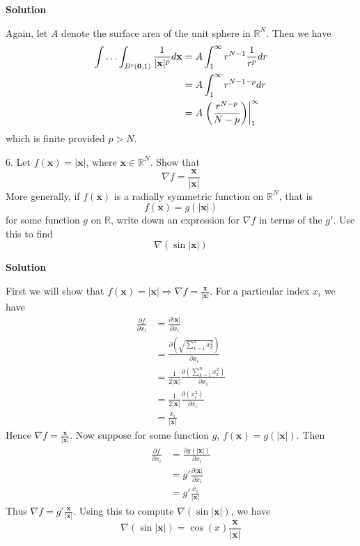 \documentclass{article}
\begin{document}
\textbf{Solution}

Again, let $A$ denote the surface area of the unit sphere in
$\mathbb{R}^{N}$. Then we have
%
\begin{align*}
    \int \ldots \int_{B^{c}(\mathbf{0}, 1)} \frac{1}{|\mathbf{x}|^{p}} d \mathbf{x}
        &= A \int_1^\infty r^{N - 1} \frac{1}{r^p} dr \\
        &= A \int_1^\infty r^{N - 1 - p} dr \\
        &= A \eval{\qty({\frac{r^{N - p}}{N - p}})}_1^\infty \\
\end{align*}
%
which is finite provided $p > N$.

\vspace{5mm}
6. Let $f(\mathbf{x}) = |\mathbf{x}|$, where $\mathbf{x} \in \mathbb{R}^{N}$.
Show that $$\nabla f = \frac{\mathbf{x}}{|\mathbf{x}|}$$ More generally,
if $f(\mathbf{x})$ is a radially symmetric function on $\mathbb{R}^{N}$,
that is $$f(\mathbf{x}) = g(|\mathbf{x}|)$$ for some function $g$ on
$\mathbb{R}$, write down an expression for $\nabla f$ in terms of the $g'$.
Use this to find $$\nabla(\sin |\mathbf{x}|)$$

\textbf{Solution}

First we will show that
$f(\mathbf{x}) = |\mathbf{x}| \Rightarrow \nabla f = \frac{\mathbf{x}}{|\mathbf{x}|}$.
For a particular index $x_i$ we have
%
\begin{align*}
    \frac{\partial f}{\partial x_i}
        &= \frac{\partial |\mathbf{x}|}{\partial x_i} \\
        &= \frac{\partial (\sqrt{\sum_{k=1}^n x_k^2})}{\partial x_i} \\
        &= \frac{1}{2 |\mathbf{x}|} \frac{\partial (\sum_{k=1}^n x_k^2)}{\partial x_i} \\
        &= \frac{1}{2 |\mathbf{x}|} \frac{\partial (x_i^2)}{\partial x_i} \\
        &= \frac{x_i}{|\mathbf{x}|}
\end{align*}
%
Hence $\nabla f = \frac{\mathbf{x}}{|\mathbf{x}|}$. Now suppose for some
function $g$, $f(\mathbf{x}) = g(|\mathbf{x}|)$. Then
%
\begin{align*}
    \frac{\partial f}{\partial x_i}
        &= \frac{\partial g(|\mathbf{x}|)}{\partial x_i} \\
        &= g' \frac{\partial |\mathbf{x}|}{\partial x_i} \\
        &= g' \frac{x_i}{|\mathbf{x}|}
\end{align*}
%
Thus $\nabla f = g' \frac{\mathbf{x}}{|\mathbf{x}|}$. Using this to
compute $\nabla(\sin |\mathbf{x}|)$, we have
%
\begin{equation*}
    \nabla(\sin |\mathbf{x}|) = \cos(x) \frac{\mathbf{x}}{|\mathbf{x}|}
\end{equation*}
\end{document}
